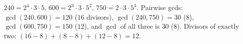 $240=2^4\cdot3\cdot5$, $600=2^3\cdot3\cdot5^2$, $750=2\cdot3\cdot5^3$. Pairwise gcds: $\gcd(240,600)=120$ ($16$ divisors), $\gcd(240,750)=30$ ($8$), $\gcd(600,750)=150$ ($12$), and $\gcd$ of all three is $30$ ($8$). Divisors of exactly two: $(16-8)+(8-8)+(12-8)=\boxed{12}$.
